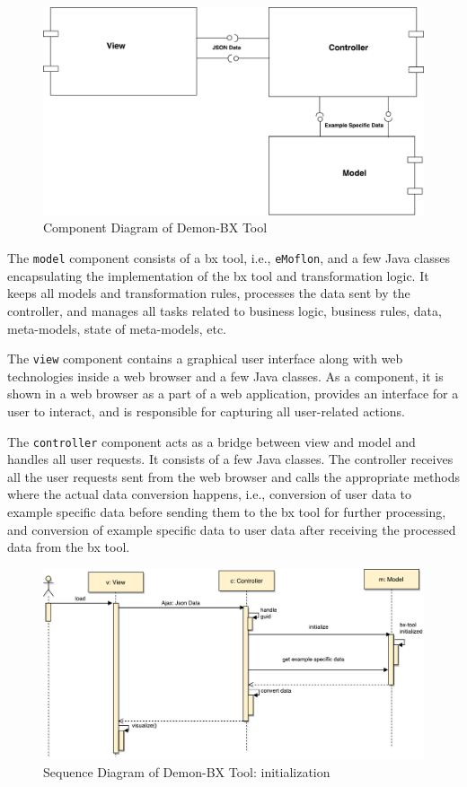 \begin{figure}[h]
	\centering
	\includegraphics[width=1\textwidth]{figures/Component_Diagram-HighLevel}
	\caption{Component Diagram of Demon-BX Tool}
	\label{fig:Component_Diagram}
\end{figure}

The \texttt{model} component consists of a bx tool, i.e., \texttt{eMoflon}, and a few Java classes encapsulating the implementation of the bx tool and transformation logic. It keeps all models and transformation rules, processes the data sent by the controller, and manages all tasks related to business logic, business rules, data, meta-models, state of meta-models, etc.

The \texttt{view} component contains a graphical user interface along with web technologies inside a web browser and a few Java classes. As a component, it is shown in a web browser as a part of a web application, provides an interface for a user to interact, and is responsible for capturing all user-related actions.

The \texttt{controller} component acts as a bridge between view and model and handles all user requests. It consists of a few Java classes. The controller receives all the user requests sent from the web browser and calls the appropriate methods where the actual data conversion happens, i.e., conversion of user data to example specific data before sending them to the bx tool for further processing, and conversion of example specific data to user data after receiving the processed data from the bx tool.

\begin{figure}
	\centering
	\includegraphics[width=1\textwidth]{figures/Sequence_Diagram-HighLevel(init)}
	\caption{Sequence Diagram of Demon-BX Tool: initialization}
	\label{fig:Sequence_Diagram-HighLevel(init)}
\end{figure}

